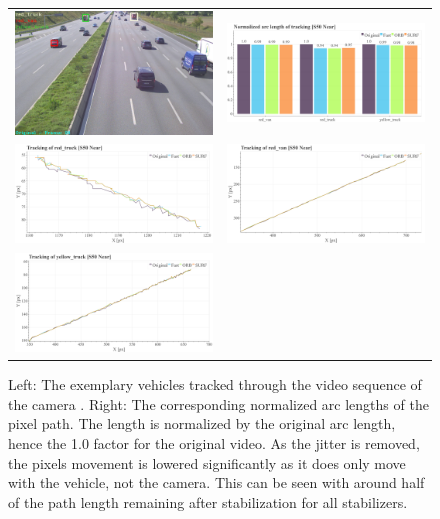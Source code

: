 \begin{figure}[!ht]
  \centering
  \begin{tabular}{cc}
    \includegraphics[width=0.45\linewidth]{diagrams/object_tracking/s50_s_near/frame.png}    &  
    \includegraphics[width=0.475\linewidth]{diagrams/object_tracking/s50_s_near/arcs.png}    \\

    \includegraphics[width=0.475\linewidth]{diagrams/object_tracking/s50_s_near/red_truck.png}    &  
    \includegraphics[width=0.475\linewidth]{diagrams/object_tracking/s50_s_near/red_van.png}    \\  
    \includegraphics[width=0.475\linewidth]{diagrams/object_tracking/s50_s_near/yellow_truck.png}   
  \end{tabular}
  \caption{Left: 
  The exemplary vehicles tracked through the video sequence of the camera . 
  Right:
  The corresponding normalized arc lengths of the pixel path. 
  The length is normalized by the original arc length, hence the 1.0 factor for the original video. 
  As the jitter is removed, the pixels movement is lowered significantly as it does only move with the vehicle, not the camera.
  This can be seen with around half of the path length remaining after stabilization for all stabilizers.
  }
  \label{fig:object_tracking_appendix_s50_s_near}
\end{figure}



